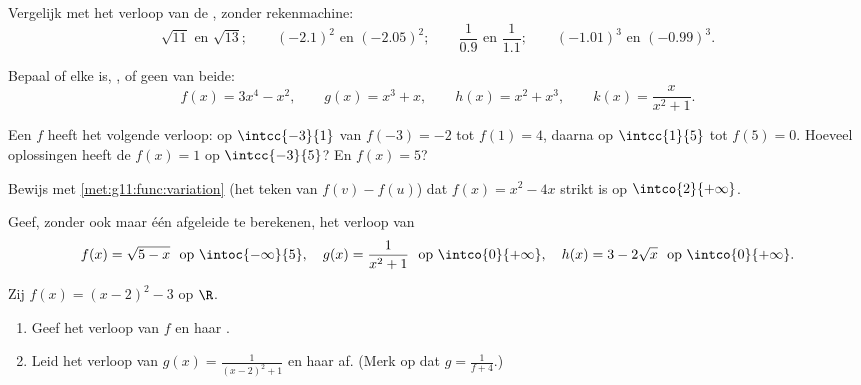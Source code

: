 \begin{exercise}[$\star$]\label{exo:g11:func:2}
Vergelijk met het verloop van de , zonder rekenmachine:
\[
\sqrt{11} \text{ en } \sqrt{13}; \qquad
(-2.1)^2 \text{ en } (-2.05)^2; \qquad
\frac{1}{0.9} \text{ en } \frac{1}{1.1}; \qquad
(-1.01)^3 \text{ en } (-0.99)^3 .
\]
\end{exercise}

\begin{exercise}[$\star$]\label{exo:g11:func:3}
Bepaal of elke   is, , of geen van beide:
\[
f(x) = 3x^4 - x^2, \qquad
g(x) = x^3 + x, \qquad
h(x) = x^2 + x^3, \qquad
k(x) = \frac{x}{x^2+1} .
\]
\end{exercise}

\begin{exercise}[$\star$]\label{exo:g11:func:4}
Een  $f$ heeft het volgende verloop:  op $\intcc{-3}{1}$ van
$f(-3) = -2$ tot $f(1) = 4$, daarna  op $\intcc{1}{5}$ tot
$f(5) = 0$. Hoeveel oplossingen heeft de  $f(x) = 1$ op
$\intcc{-3}{5}$? En $f(x) = 5$?
\end{exercise}

\begin{exercise}[$\star\star$]\label{exo:g11:func:5}
Bewijs met \cref{met:g11:func:variation} (het teken van $f(v) - f(u)$) dat
$f(x) = x^2 - 4x$ strikt  is op $\intco{2}{+\infty}$.
\end{exercise}

\begin{exercise}[$\star\star$]\label{exo:g11:func:6}
Geef, zonder ook maar één afgeleide te berekenen, het verloop van
\[
f(x) = \sqrt{5 - x} \ \text{ op } \intoc{-\infty}{5},
\quad
g(x) = \frac{1}{x^2 + 1} \ \text{ op } \intco{0}{+\infty},
\quad
h(x) = 3 - 2\sqrt{x} \ \text{ op } \intco{0}{+\infty}.
\]
\end{exercise}

\begin{exercise}[$\star\star$]\label{exo:g11:func:7}
Zij $f(x) = (x-2)^2 - 3$ op $\R$.
\begin{enumerate}
  \item Geef het verloop van $f$ en haar .
  \item Leid het verloop van $g(x) = \frac{1}{(x-2)^2+1}$ en haar  af.
        (Merk op dat $g = \frac{1}{f + 4}$.)
\end{enumerate}
\end{exercise}

